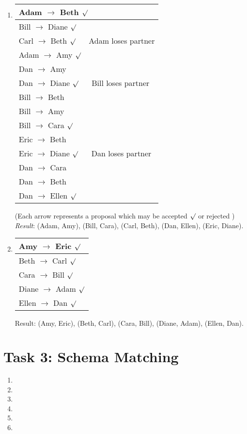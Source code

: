 \documentclass{scrartcl}
\begin{document}
\begin{enumerate}
		\item\phantom{phantom}
		\begin{center}
			\begin{tabular}{|l|}
				\hline
				Adam $\to$ Beth $\surd$\\\hline
				Bill $\to$ Diane $\surd$\\\hline
				Carl $\to$ Beth $\surd$ $\quad$ Adam loses partner\\\hline
				Adam $\to$ Amy $\surd$\\\hline
				Dan $\to$ Amy \lightning\\\hline
				Dan $\to$ Diane $\surd$ $\quad$ Bill loses partner\\\hline
				Bill $\to$ Beth \lightning\\\hline
				Bill $\to$ Amy \lightning\\\hline
				Bill $\to$ Cara $\surd$\\\hline
				Eric $\to$ Beth \lightning\\\hline
				Eric $\to$ Diane $\surd$ $\quad$ Dan loses partner\\\hline
				Dan $\to$ Cara \lightning\\\hline
				Dan $\to$ Beth \lightning\\\hline
				Dan $\to$ Ellen $\surd$\\
				\hline
			\end{tabular}
		\end{center}
		(Each arrow represents a proposal which may be accepted $\surd$ or rejected \lightning)\\
		\textit{Result}: (Adam, Amy), (Bill, Cara), (Carl, Beth), (Dan, Ellen), (Eric, Diane).
		
		\item\phantom{phantom}
		\begin{center}
			\begin{tabular}{|l|}
				\hline
				Amy $\to$ Eric $\surd$\\\hline
				Beth $\to$ Carl $\surd$\\\hline
				Cara $\to$ Bill $\surd$\\\hline
				Diane $\to$ Adam $\surd$\\\hline
				Ellen $\to$ Dan $\surd$\\
				\hline
			\end{tabular}
		\end{center}
	Result: (Amy, Eric), (Beth, Carl), (Cara, Bill), (Diane, Adam), (Ellen, Dan).
		
	\end{enumerate}
	
	\section*{Task 3: Schema Matching}
	\begin{enumerate}
		\item
		
		\item
		
		\item
		
		\item
		
		\item
		
		\item
		
	\end{enumerate}
\end{document}
